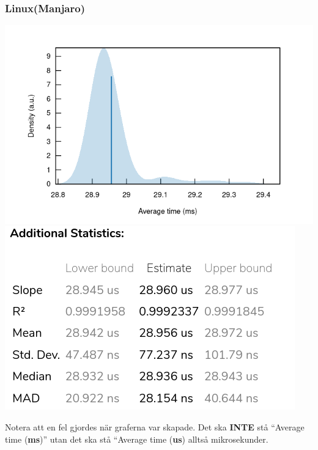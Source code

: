 \documentclass[12pt, a4paper]{report}
\begin{document}
   \subsubsection{Linux(Manjaro)}
   \includegraphics[width=1\textwidth]{bench_linux_average_time}
   \includegraphics[width=.8\textwidth]{add_stats_linux}

   Notera att en fel gjordes när graferna var skapade. Det ska \textbf{INTE} stå ``Average time (\textbf{ms})'' utan det ska stå ``Average time (\textbf{us}) alltså mikrosekunder.
\end{document}
